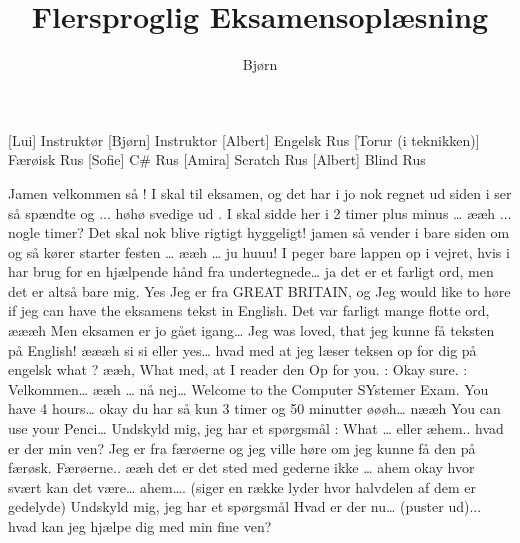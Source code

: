 \documentclass[a4paper,11pt]{article}
\title{Flersproglig Eksamensoplæsning}
\author{Bjørn}
\begin{document}
\maketitle

\begin{roles}
[Lui] Instruktør
[Bjørn] Instruktor
[Albert] Engelsk Rus 
[Torur (i teknikken)] Færøisk Rus 
[Sofie] C# Rus 
[Amira] Scratch Rus 
[Albert] Blind Rus 
\end{roles}

\begin{props}
\end{props}


\begin{sketch}
 Jamen velkommen så ! I skal til eksamen, og det har i jo nok regnet ud siden i ser så spændte og ... høhø svedige ud . I skal sidde her i 2 timer plus minus … ææh ... nogle timer?
Det skal nok blive rigtigt hyggeligt! jamen så vender i bare siden om og så kører starter festen … ææh … ju huuu!
 I peger bare lappen op i vejret, hvis i har brug for en hjælpende hånd fra undertegnede… ja det er et farligt ord, men det er altså bare mig.
 Yes Jeg er fra GREAT BRITAIN, og Jeg would like to høre if jeg can have the eksamens tekst in English.
 Det var farligt mange flotte ord, æææh Men eksamen er jo gået igang…
 Jeg was loved, that jeg kunne få teksten på English!
 æææh si si eller yes… hvad med at jeg læser teksen op for dig på engelsk
 what ?
 ææh, What med, at I reader den Op for you.
: Okay sure.
: Velkommen… ææh … nå nej… Welcome to the Computer SYstemer Exam. You have 4 hours… okay du har så kun 3 timer og 50 minutter øøøh… nææh You can use your Penci…
 Undskyld mig, jeg har et spørgsmål
: What … eller æhem.. hvad er der min ven?
 Jeg er fra færøerne og jeg ville høre om jeg kunne få den på færøsk.
 Færøerne.. ææh det er det sted med gederne ikke … ahem okay hvor svært kan det være… ahem…. (siger en række lyder hvor halvdelen af dem er gedelyde)
 Undskyld mig, jeg har et spørgsmål
 Hvad er der nu… (puster ud)... hvad kan jeg hjælpe dig med min fine ven? 

\end{sketch}
\end{document}
